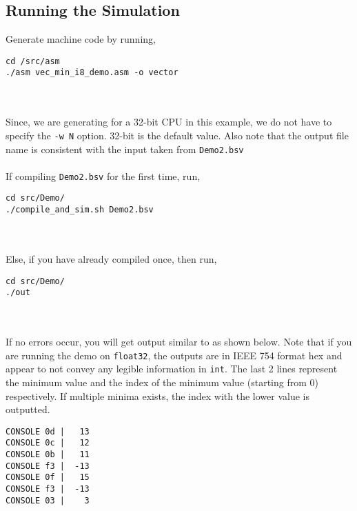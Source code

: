 \begin{paper}
\section*{Running the Simulation\sdot}
Generate machine code by running, 
\begin{verbatim}
cd /src/asm
./asm vec_min_i8_demo.asm -o vector
\end{verbatim}\\\\
\nointend Since, we are generating for a 32-bit CPU in this example, we do not have to specify the \texttt{-w N} option. 32-bit is the default value. Also note that the output file name is consistent with the input taken from \texttt{Demo2.bsv}\\\\
\nointend If compiling \texttt{Demo2.bsv} for the first time, run,
\begin{verbatim}
cd src/Demo/
./compile_and_sim.sh Demo2.bsv 
\end{verbatim}\\\\
\nointend Else, if you have already compiled once, then run,
\begin{verbatim}
cd src/Demo/
./out
\end{verbatim}\\\\
\nointend If no errors occur, you will get output similar to as shown below. Note that if you are running the demo on \texttt{float32}, the outputs are in IEEE 754 format hex and appear to not convey any legible information in \texttt{int}. The last 2 lines represent the minimum value and the index of the minimum value (starting from 0) respectively. If multiple minima exists, the index with the lower value is outputted.
\begin{verbatim}
CONSOLE 0d |   13
CONSOLE 0c |   12
CONSOLE 0b |   11
CONSOLE f3 |  -13
CONSOLE 0f |   15
CONSOLE f3 |  -13
CONSOLE 03 |    3
\end{verbatim}\\
\end{paper}